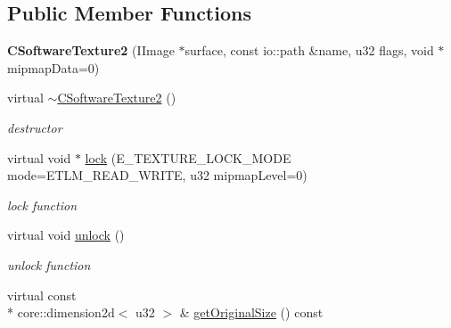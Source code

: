 \subsection*{Public Member Functions}
\begin{DoxyCompactItemize}
\item 
\hypertarget{classirr_1_1video_1_1_c_software_texture2_a0f0b23cec77dbfd96b20868d00a88ef2}{{\bfseries C\-Software\-Texture2} (I\-Image $\ast$surface, const io\-::path \&name, u32 flags, void $\ast$mipmap\-Data=0)}\label{classirr_1_1video_1_1_c_software_texture2_a0f0b23cec77dbfd96b20868d00a88ef2}

\item 
\hypertarget{classirr_1_1video_1_1_c_software_texture2_ae081b5ca79dfc8d273d23c9bf3d19de3}{virtual \hyperlink{classirr_1_1video_1_1_c_software_texture2_ae081b5ca79dfc8d273d23c9bf3d19de3}{$\sim$\-C\-Software\-Texture2} ()}\label{classirr_1_1video_1_1_c_software_texture2_ae081b5ca79dfc8d273d23c9bf3d19de3}

\begin{DoxyCompactList}\small\item\em destructor \end{DoxyCompactList}\item 
\hypertarget{classirr_1_1video_1_1_c_software_texture2_a14d82c52f921e5d1972374c66abd05c0}{virtual void $\ast$ \hyperlink{classirr_1_1video_1_1_c_software_texture2_a14d82c52f921e5d1972374c66abd05c0}{lock} (E\-\_\-\-T\-E\-X\-T\-U\-R\-E\-\_\-\-L\-O\-C\-K\-\_\-\-M\-O\-D\-E mode=E\-T\-L\-M\-\_\-\-R\-E\-A\-D\-\_\-\-W\-R\-I\-T\-E, u32 mipmap\-Level=0)}\label{classirr_1_1video_1_1_c_software_texture2_a14d82c52f921e5d1972374c66abd05c0}

\begin{DoxyCompactList}\small\item\em lock function \end{DoxyCompactList}\item 
\hypertarget{classirr_1_1video_1_1_c_software_texture2_a76f6d8a5dd07ae944b5eeef07c2a2027}{virtual void \hyperlink{classirr_1_1video_1_1_c_software_texture2_a76f6d8a5dd07ae944b5eeef07c2a2027}{unlock} ()}\label{classirr_1_1video_1_1_c_software_texture2_a76f6d8a5dd07ae944b5eeef07c2a2027}

\begin{DoxyCompactList}\small\item\em unlock function \end{DoxyCompactList}\item 
\hypertarget{classirr_1_1video_1_1_c_software_texture2_a7c7a0c2972b6e91e36f70403145fcfca}{virtual const \\*
core\-::dimension2d$<$ u32 $>$ \& \hyperlink{classirr_1_1video_1_1_c_software_texture2_a7c7a0c2972b6e91e36f70403145fcfca}{get\-Original\-Size} () const }\label{classirr_1_1video_1_1_c_software_texture2_a7c7a0c2972b6e91e36f70403145fcfca}


\end{DoxyCompactItemize}
